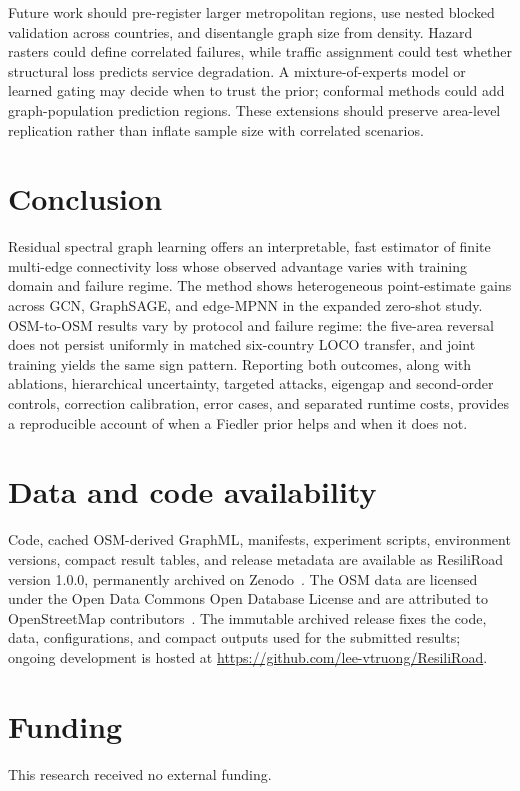 \documentclass[11pt]{article}
\begin{document}
Future work should pre-register larger metropolitan regions, use nested blocked
validation across countries, and disentangle graph size from density. Hazard rasters
could define correlated failures, while traffic assignment could test whether
structural loss predicts service degradation. A mixture-of-experts model or learned
gating may decide when to trust the prior; conformal methods could add
graph-population prediction regions. These extensions should preserve area-level
replication rather than inflate sample size with correlated scenarios.

\section{Conclusion}
Residual spectral graph learning offers an interpretable, fast estimator of
finite multi-edge connectivity loss whose observed advantage varies with
training domain and failure regime. The method shows heterogeneous point-estimate gains across
GCN, GraphSAGE, and edge-MPNN in the expanded zero-shot study. OSM-to-OSM
results vary by protocol and failure regime: the
five-area reversal does not persist uniformly in matched six-country LOCO
transfer, and joint training yields the same sign pattern.
Reporting both outcomes, along with ablations, hierarchical
uncertainty, targeted attacks, eigengap and second-order controls, correction
calibration, error cases, and separated runtime costs, provides a
reproducible account of when a Fiedler prior helps and when it does not.

\section*{Data and code availability}
Code, cached OSM-derived GraphML, manifests, experiment scripts, environment
versions, compact result tables, and release metadata are available as
ResiliRoad version 1.0.0, permanently archived on Zenodo~\cite{resiliroad}.
The OSM data are licensed under the Open Data Commons Open Database License and are
attributed to OpenStreetMap contributors~\cite{osm}. The immutable archived
release fixes the code, data, configurations, and compact outputs used for the
submitted results; ongoing development is hosted at
\url{https://github.com/lee-vtruong/ResiliRoad}.

\section*{Funding}
This research received no external funding.
\end{document}
